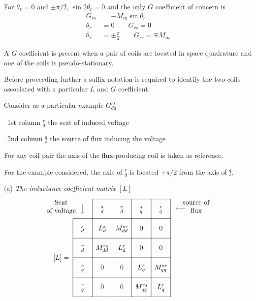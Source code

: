 \documentclass[a4paper,numbers=noenddot,12pt]{scrbook}
\begin{document}
        For $\theta_r = 0$ and $\pm \pi / 2$, $\sin 2 \theta_r = 0$ and the only $G$ coefficient of concern is
        \begin{align}
            G_{rs} & =  - M_m \sin \theta_r \\
            \theta_r & = 0  \qquad G_{rs} = 0 \nonumber \\
            \theta_r & = \pm \frac{\pi}{2} \qquad G_{rs} = \mp M_m \nonumber
        \end{align}

        A $G$ coefficient is present when a pair of coils are located in space quadrature and one of the coils is pseudo-stationary.

        Before proceeding further a suffix notation is required to identify the two coils associated with a particular $L$ and $G$ coefficient.

        Consider as a particular example $G_{dq}^{rs}$ 

        \TabPositions{1.5cm}
        \tab\ 1st column $_d^r$ the seat of induced voltage \par
        \tab\ 2nd column $_s^q$ the source of flux inducing the voltage

        For any coil pair the axis of the flux-producing coil is taken as reference.

        For the example considered, the axis of $_d^r$ is located $+\pi/2$ from the axis of $_s^q$.

        \vspace{2em}

        \noindent (a) \emph{The inductance coefficient matrix} $[L]$
        \begin{equation}
            \begin{tikzpicture} [anchor = base, baseline =0pt]
                \draw (0,0)--(5,0) (0,1)--(5,1) (0,2)--(5,2) (1,3)--(5,3) (0,-1)--(5,-1) (0,-2)--(5,-2);
                \draw (0,-2)--(0,2) (1,-2)--(1,3) (2,-2)--(2,3) (3,-2)--(3,3) (4,-2)--(4,3) (5,-2)--(5,3);
                \draw (0.5,-1.6) node{$_q^r$} +(0,1) node{$_q^s$} +(0,2) node{$_d^r$} +(0,3) node{$_d^s$};
                \draw (1.5,-1.6) node{0} +(0,1) node{0} +(0,2) node{$M_{dd}^{rs}$} +(0,3) node{$L_d^s$}+(0,4) node{$_d^s$};
                \draw (2.5,-1.6) node{0} +(0,1) node{0} +(0,2) node{$L_{d}^{r}$} +(0,3) node{$M_{dd}^{sr}$}+(0,4) node{$_d^r$};
                \draw (3.5,-1.6) node{$M_{qq}^{rs}$} +(0,1) node{$L_q^s$} +(0,2) node{0} +(0,3) node{0}+(0,4) node{$_q^s$};
                \draw (4.5,-1.6) node{$L_q^r$} +(0,1) node{$M_{qq}^{sr}$} +(0,2) node{0} +(0,3) node{0}+(0,4) node{$_q^r$};
                \draw (-0.6,-0.1) node{$[L] =$};
                \draw [align = center,->](-0.6, 2.3) node{Seat\\of voltage} (0.5,2.75)--(0.5, 2.25);
                \draw [align = center,->](6.3, 2.3) node{source of\\flux} (5.75,2.5)--(5.25,2.5);
            \end{tikzpicture}
        \end{equation}
\end{document}

